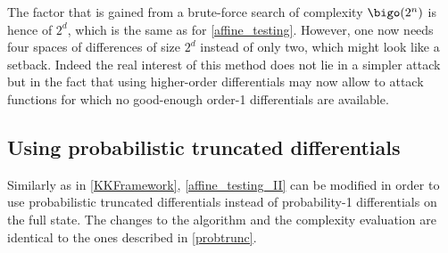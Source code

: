       The factor that is gained from a brute-force search of complexity $\bigo(2^n)$ is hence of
      $2^d$, which is the same as for \autoref{affine_testing}. However, one now needs
      four spaces of differences of size $2^d$ instead of only two,
      which might look like a setback. Indeed the real
      interest of this method does not lie in a simpler attack but in the fact that
      using higher-order differentials may now allow to attack functions for which no
      good-enough order-1 differentials are available.


    \subsection{Using probabilistic truncated differentials}
    Similarly as in  \autoref{KKFramework}, \autoref{affine_testing_II} can be modified in order
    to use probabilistic truncated differentials instead of probability-1 differentials
    on the full state. The changes to the algorithm and the complexity evaluation are
    identical to the ones described in \autoref{probtrunc}.
